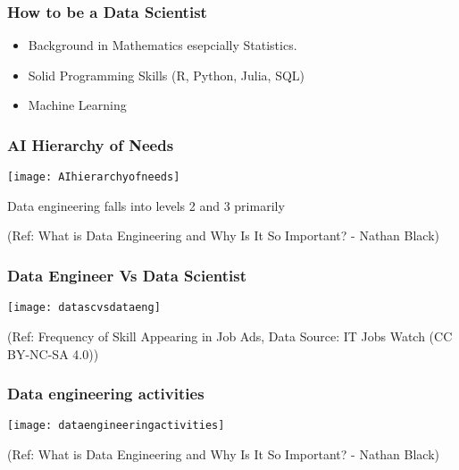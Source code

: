 \begin{frame}[fragile]\frametitle{How to be a Data Scientist}
\begin{itemize}
\item Background in Mathematics  esepcially Statistics.
\item Solid Programming Skills (R, Python, Julia, SQL)
\item Machine Learning
\end{itemize}
\end{frame}

\begin{frame}[fragile]\frametitle{AI Hierarchy of Needs}

\begin{center}
\texttt{[image: AIhierarchyofneeds]}

Data engineering falls into levels 2 and 3 primarily
\end{center}

{\tiny (Ref: What is Data Engineering and Why Is It So Important? - Nathan Black)}

\end{frame}

\begin{frame}[fragile]\frametitle{Data Engineer Vs Data Scientist}

\begin{center}
\texttt{[image: datascvsdataeng]}

\end{center}

{\tiny (Ref: Frequency of Skill Appearing in Job Ads, Data Source: IT Jobs Watch (CC BY-NC-SA 4.0))}

\end{frame}


\begin{frame}[fragile]\frametitle{Data engineering activities}

\begin{center}
\texttt{[image: dataengineeringactivities]}

\end{center}

{\tiny (Ref: What is Data Engineering and Why Is It So Important? - Nathan Black)}

\end{frame}

